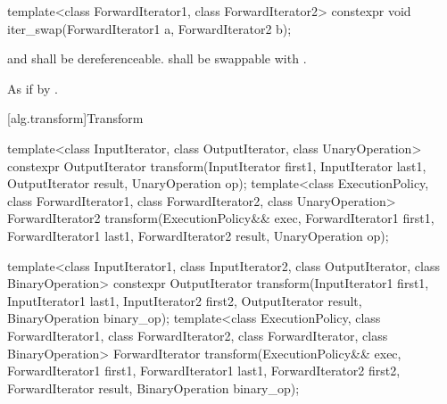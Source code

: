 %
\begin{itemdecl}
template<class ForwardIterator1, class ForwardIterator2>
  constexpr void iter_swap(ForwardIterator1 a, ForwardIterator2 b);
\end{itemdecl}

\begin{itemdescr}
\pnum
\requires
{} and  shall be dereferenceable.  shall be
swappable with .

\pnum
\effects
As if by .
\end{itemdescr}

[alg.transform]{Transform}

%
\begin{itemdecl}
template<class InputIterator, class OutputIterator,
         class UnaryOperation>
  constexpr OutputIterator
    transform(InputIterator first1, InputIterator last1,
              OutputIterator result, UnaryOperation op);
template<class ExecutionPolicy, class ForwardIterator1, class ForwardIterator2,
         class UnaryOperation>
  ForwardIterator2
    transform(ExecutionPolicy&& exec,
              ForwardIterator1 first1, ForwardIterator1 last1,
              ForwardIterator2 result, UnaryOperation op);

template<class InputIterator1, class InputIterator2,
         class OutputIterator, class BinaryOperation>
  constexpr OutputIterator
    transform(InputIterator1 first1, InputIterator1 last1,
              InputIterator2 first2, OutputIterator result,
              BinaryOperation binary_op);
template<class ExecutionPolicy, class ForwardIterator1, class ForwardIterator2,
         class ForwardIterator, class BinaryOperation>
  ForwardIterator
    transform(ExecutionPolicy&& exec,
              ForwardIterator1 first1, ForwardIterator1 last1,
              ForwardIterator2 first2, ForwardIterator result,
              BinaryOperation binary_op);


\end{itemdecl}

